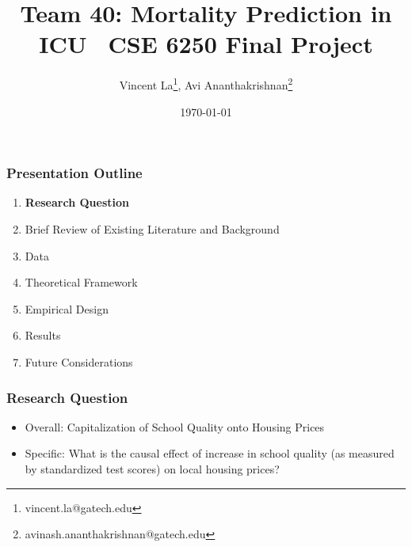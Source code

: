 \documentclass{beamer}
\title{Team 40: Mortality Prediction in ICU \ \newline CSE 6250 Final Project}
\author{Vincent La\footnote{vincent.la@gatech.edu}, Avi Ananthakrishnan\footnote{avinash.ananthakrishnan@gatech.edu}}
\institute{Georgia Tech}
\date{\today}
\begin{document}
\maketitle

\begin{frame}
\label{Presentation Outline 1}
\frametitle{Presentation Outline}
\begin{enumerate}
\item[1.] \textbf{Research Question}
\newline
\item[2.] Brief Review of Existing Literature and Background
\newline
\item[3.] Data
\newline
\item[4.] Theoretical Framework
\newline
\item[5.] Empirical Design
\newline
\item[6.] Results
\newline
\item[7.] Future Considerations
\end{enumerate}
\end{frame}

\begin{frame}
\label{Research Question}
\frametitle{Research Question}
\begin{itemize}
	\item Overall: Capitalization of School Quality onto Housing Prices
	\newline
	\item Specific: What is the causal effect of increase in school quality (as measured by standardized test scores) on local housing prices?
\end{itemize}
\end{frame}
\end{document}
